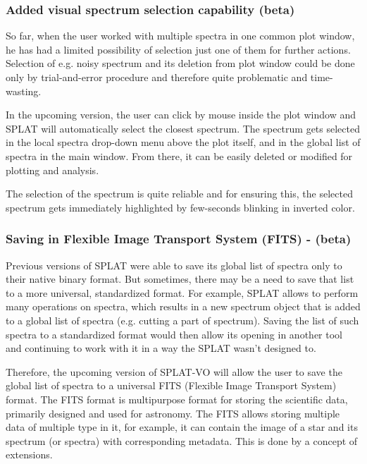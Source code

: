 \documentclass[final,authoryear,5p,times,twocolumn]{elsarticle}
\begin{document}
\subsubsection{Added visual spectrum selection capability (beta)}

So far, when the user worked with multiple spectra in one common plot
window, he has had a limited possibility of selection just one of them
for further actions. Selection of e.g. noisy spectrum and its deletion
from plot window could be done only by trial-and-error procedure and
therefore quite problematic and time-wasting.

In the upcoming version, the user can click by mouse inside the plot
window and SPLAT will automatically select the closest spectrum. The
spectrum gets selected in the local spectra drop-down menu above the
plot itself, and in the global list of spectra in the main
window. From there, it can be easily deleted or modified for plotting
and analysis.

The selection of the spectrum is quite reliable and for ensuring this,
the selected spectrum gets immediately highlighted by few-seconds
blinking in inverted color.

\subsubsection{Saving in Flexible Image Transport System (FITS) - (beta)}

Previous versions of SPLAT were able to save its global list of
spectra only to their native binary format. But sometimes, there may
be a need to save that list to a more universal, standardized
format. For example, SPLAT allows to perform many operations on
spectra, which results in a new spectrum object that is added to a
global list of spectra (e.g. cutting a part of spectrum). Saving the
list of such spectra to a standardized format would then allow its
opening in another tool and continuing to work with it in a way the
SPLAT wasn't designed to.

Therefore, the upcoming version of SPLAT-VO will allow the user to
save the global list of spectra to a universal FITS (Flexible Image
Transport System) format. The FITS format is multipurpose format for
storing the scientific data, primarily designed and used for
astronomy. The FITS allows storing multiple data of multiple type in
it, for example, it can contain the image of a star and its spectrum
(or spectra) with corresponding metadata. This is done by a concept of
extensions.
\end{document}
